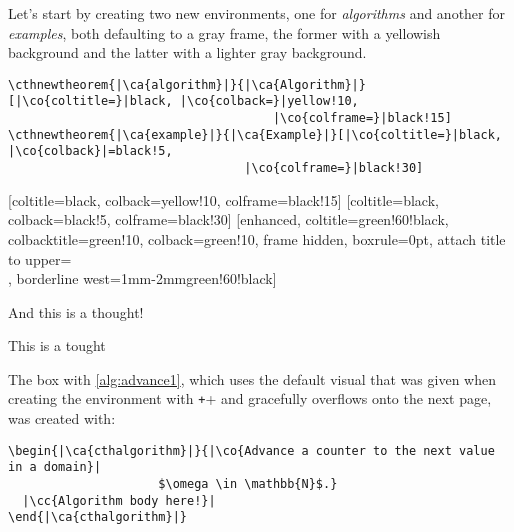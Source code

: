 \documentclass{article}
\begin{document}
Let's start by creating two new environments, one for \emph{algorithms} and another for \emph{examples}, both defaulting to a gray frame, the former with a yellowish background and the latter with a lighter gray background.

\begin{verbatim}
\cthnewtheorem{|\ca{algorithm}|}{|\ca{Algorithm}|}[|\co{coltitle=}|black, |\co{colback=}|yellow!10,
                                     |\co{colframe=}|black!15]
\cthnewtheorem{|\ca{example}|}{|\ca{Example}|}[|\co{coltitle=}|black, |\co{colback}|=black!5,
                                 |\co{colframe=}|black!30]  
\end{verbatim}

[coltitle=black, colback=yellow!10, colframe=black!15]
[coltitle=black, colback=black!5, colframe=black!30]
[enhanced, coltitle=green!60!black, colbacktitle=green!10, 
                                colback=green!10, frame hidden, boxrule=0pt, 
                                attach title to upper={\\[0.5ex]}, 
                                borderline west={1mm}{-2mm}{green!60!black}]

And this is a thought!
\begin{cththought}{This is a tought}
\kant[2]
\end{cththought}

The box with \autoref{alg:advance1}, which uses the default visual that was given when creating the environment with \texttt+\cthnewtheorem+ and gracefully overflows onto the next page, was created with:
\begin{verbatim}
\begin{|\ca{cthalgorithm}|}{|\co{Advance a counter to the next value in a domain}|
                     $\omega \in \mathbb{N}$.}
  |\cc{Algorithm body here!}|
\end{|\ca{cthalgorithm}|}
\end{verbatim}

\newcommand{\bracesemptyset}{\ensuremath{\lbrace\,\rbrace}}
\end{document}
